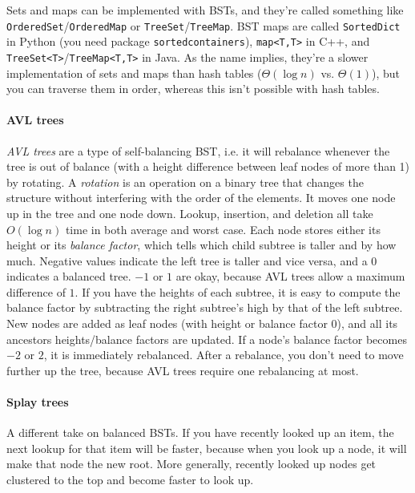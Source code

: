 \documentclass[8pt, table, xcdraw]{article}%
\begin{document}
Sets and maps can be implemented with BSTs, and they're called something like \lstinline{OrderedSet}/\lstinline{OrderedMap} or \lstinline{TreeSet}/\lstinline{TreeMap}. BST maps are called \lstinline{SortedDict} in Python (you need package \lstinline{sortedcontainers}), \lstinline{map<T,T>} in C++, and \lstinline{TreeSet<T>}/\lstinline{TreeMap<T,T>} in Java. As the name implies, they're a slower implementation of sets and maps than hash tables ($\Theta(\log n)$ vs. $\Theta(1)$), but you can traverse them in order, whereas this isn't possible with hash tables.

\paragraph{AVL trees}

\emph{AVL trees} are a type of self-balancing BST, i.e. it will rebalance whenever the tree is out of balance (with a height difference  between leaf nodes of more than 1) by rotating. A \emph{rotation} is an operation on a binary tree that changes the structure without interfering with the order of the elements. It moves one node up in the tree and one node down. Lookup, insertion, and deletion all take $O(\log n)$ time in both average and worst case. Each node stores either its height or its \emph{balance factor}, which tells which child subtree is taller and by how much. Negative values indicate the left tree is taller and vice versa, and a $0$ indicates a balanced tree. $-1$ or $1$ are okay, because AVL trees allow a maximum difference of $1$. If you have the heights of each subtree, it is easy to compute the balance factor by subtracting the right subtree's high by that of the left subtree. New nodes are added as leaf nodes (with height or balance factor $0$), and all its ancestors heights/balance factors are updated. If a node's balance factor becomes $-2$ or $2$, it is immediately rebalanced. After a rebalance, you don't need to move further up the tree, because AVL trees require one rebalancing at most.

\paragraph{Splay trees}

A different take on balanced BSTs. If you have recently looked up an item, the next lookup for that item will be faster, because when you look up a node, it will make that node the new root. More generally, recently looked up nodes get clustered to the top and become faster to look up.
\end{document}
